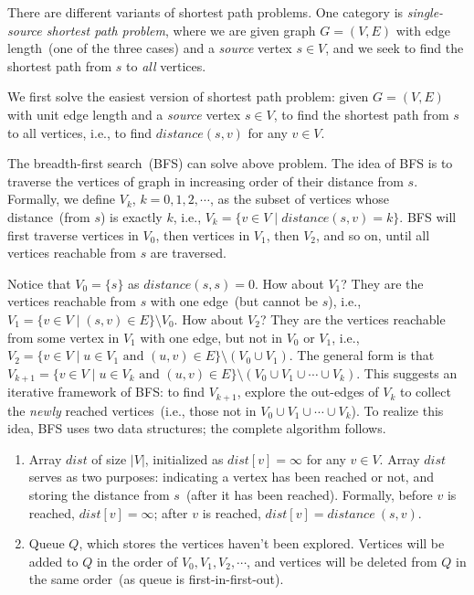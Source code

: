 There are different variants of shortest path problems.
One category is \emph{single-source shortest path problem}, where
we are given graph $G = (V, E)$ with edge length~(one of the three cases)
and a \emph{source} vertex $s\in V$, and we seek to find the shortest
path from $s$ to \emph{all} vertices.


We first solve the easiest version of shortest path problem: 
given $G = (V, E)$ with unit edge length and a \emph{source} vertex $s\in V$,
to find the shortest path from $s$ to all vertices, i.e., to find $distance(s, v)$ for any $v\in V$.

The breadth-first search~(BFS) can solve above problem. The idea of BFS
is to traverse the vertices of graph in increasing order of their distance from $s$.
Formally, we define $V_k$, $k = 0, 1, 2, \cdots$, as the subset of
vertices whose distance~(from $s$) is exactly $k$, i.e., $V_k = \{v \in V \mid distance(s, v) = k\}$.
BFS will first traverse vertices in $V_0$, then vertices in $V_1$, then $V_2$, and so on,
until all vertices reachable from $s$ are traversed.

Notice that $V_0 = \{s\}$ as $distance(s, s) = 0$.
How about $V_1$? They are the vertices reachable from $s$ with one edge~(but cannot be $s$), i.e., $V_1 = \{v \in V \mid (s, v) \in E\}\setminus V_0$.
How about $V_2$? They are the vertices reachable from some vertex in $V_1$ with one edge, but not in $V_0$ or $V_1$, i.e., $V_2 = \{v \in V \mid u\in V_1 \textrm{ and } (u, v) \in E\} \setminus (V_0\cup V_1)$.
The general form is that $V_{k + 1} = \{v \in V \mid u \in V_k \textrm{ and } (u, v) \in E\} \setminus (V_0\cup V_1 \cup \cdots \cup V_k)$.
This suggests an iterative framework of BFS: to find $V_{k+1}$, explore the out-edges of $V_k$ to collect the \emph{newly} reached 
vertices~(i.e., those not in $V_0\cup V_1 \cup \cdots \cup V_k$).
To realize this idea, BFS uses two data structures; the complete algorithm follows. 
\begin{enumerate}
\item Array $dist$ of size $|V|$, initialized as $dist[v] = \infty$ for any $v\in V$.
Array $dist$ serves as two purposes: indicating a vertex has been reached or not,
and storing the distance from $s$~(after it has been reached).
Formally, before $v$ is reached, $dist[v] = \infty$;
after $v$ is reached, $dist[v] = distance~(s, v)$.

\item Queue $Q$, which stores the vertices haven't been explored.
Vertices will be added to $Q$ in the order of $V_0, V_1, V_2, \cdots$,
and vertices will be deleted from $Q$ in the same order~(as queue is first-in-first-out).
\end{enumerate}

